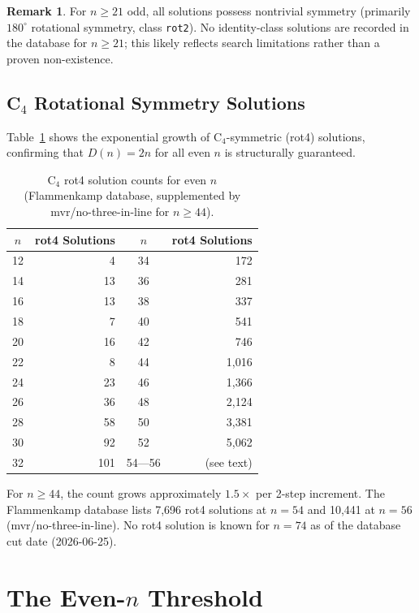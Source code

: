 \documentclass[11pt,a4paper]{article}
\theoremstyle{plain}
\theoremstyle{definition}
\newtheorem{remark}[theorem]{Remark}
\begin{document}
\begin{remark}
For $n\ge 21$ odd, all solutions possess nontrivial symmetry (primarily $180^\circ$ rotational symmetry, class \texttt{rot2}). No identity-class solutions are recorded in the database for $n\ge 21$; this likely reflects search limitations rather than a proven non-existence.
\end{remark}

\subsection{C$_4$ Rotational Symmetry Solutions}

Table~\ref{tab:c4counts} shows the exponential growth of C$_4$-symmetric (rot4) solutions, confirming that $D(n)=2n$ for all even $n$ is structurally guaranteed.

\begin{table}[H]
\centering
\caption{C$_4$ rot4 solution counts for even $n$ (Flammenkamp database, supplemented by mvr/no-three-in-line for $n\ge44$).}
\label{tab:c4counts}
\footnotesize
\begin{tabular}{crcr}
\toprule
$n$ & rot4 Solutions & $n$ & rot4 Solutions \\
\midrule
12 & 4 & 34 & 172\\
14 & 13 & 36 & 281\\
16 & 13 & 38 & 337\\
18 & 7 & 40 & 541\\
20 & 16 & 42 & 746\\
22 & 8 & 44 & 1,016\\
24 & 23 & 46 & 1,366\\
26 & 36 & 48 & 2,124\\
28 & 58 & 50 & 3,381\\
30 & 92 & 52 & 5,062\\
32 & 101 & 54---56 & (see text)\\
\bottomrule
\end{tabular}
\end{table}

For $n\ge44$, the count grows approximately $1.5\times$ per 2-step increment. The Flammenkamp database lists 7,696 rot4 solutions at $n=54$ and 10,441 at $n=56$ (mvr/no-three-in-line). No rot4 solution is known for $n=74$ as of the database cut date (2026-06-25).

\section{The Even-$n$ Threshold}
\label{sec:even}
\end{document}
